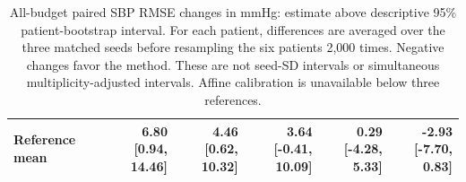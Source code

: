 \documentclass[11pt]{article}
\begin{document}
\begin{table}[!htbp]
\begin{tabular}{lrrrrr}
Reference mean & \shortstack{6.80\\{[0.94, 14.46]}} & \shortstack{4.46\\{[0.62, 10.32]}} & \shortstack{3.64\\{[-0.41, 10.09]}} & \shortstack{0.29\\{[-4.28, 5.33]}} & \shortstack{-2.93\\{[-7.70, 0.83]}}\\
\bottomrule\end{tabular}
\caption{All-budget paired SBP RMSE changes in mmHg: estimate above descriptive 95\% patient-bootstrap interval. For each patient, differences are averaged over the three matched seeds before resampling the six patients 2,000 times. Negative changes favor the method. These are not seed-SD intervals or simultaneous multiplicity-adjusted intervals. Affine calibration is unavailable below three references.}\end{table}
\end{document}
